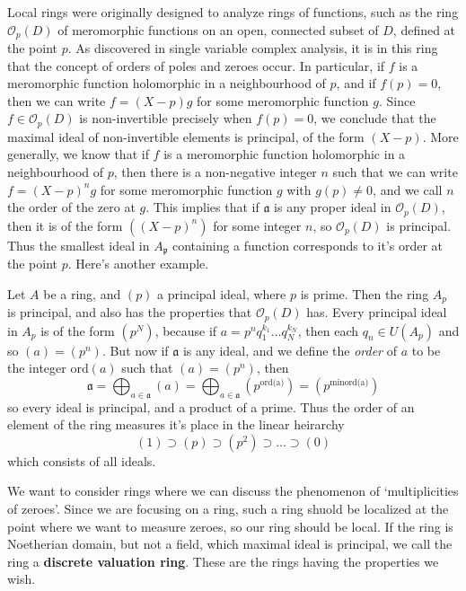 Local rings were originally designed to analyze rings of functions, such as the ring $\mathcal{O}_p(D)$ of meromorphic functions on an open, connected subset of $D$, defined at the point $p$. As discovered in single variable complex analysis, it is in this ring that the concept of orders of poles and zeroes occur. In particular, if $f$ is a meromorphic function holomorphic in a neighbourhood of $p$, and if $f(p) = 0$, then we can write $f = (X-p)g$ for some meromorphic function $g$. Since $f \in \mathcal{O}_p(D)$ is non-invertible precisely when $f(p) = 0$, we conclude that the maximal ideal of non-invertible elements is principal, of the form $(X-p)$. More generally, we know that if $f$ is a meromorphic function holomorphic in a neighbourhood of $p$, then there is a non-negative integer $n$ such that we can write $f = (X-p)^ng$ for some meromorphic function $g$ with $g(p) \neq 0$, and we call $n$ the order of the zero at $g$. This implies that if $\mathfrak{a}$ is any proper ideal in $\mathcal{O}_p(D)$, then it is of the form $((X - p)^n)$ for some integer $n$, so $\mathcal{O}_p(D)$ is principal. Thus the smallest ideal in $A_{\mathfrak{p}}$ containing a function corresponds to it's order at the point $p$. Here's another example.

\begin{example}
    Let $A$ be a ring, and $(p)$ a principal ideal, where $p$ is prime. Then the ring $A_p$ is principal, and also has the properties that $\mathcal{O}_p(D)$ has. Every principal ideal in $A_p$ is of the form $(p^N)$, because if $a = p^n q_1^{k_1} \dots q_N^{k_N}$, then each $q_n \in U(A_p)$ and so $(a) = (p^n)$. But now if $\mathfrak{a}$ is any ideal, and we define the {\it order} of $a$ to be the integer $\text{ord}(a)$ such that $(a) = (p^n)$, then
    \[ \mathfrak{a} = \bigoplus_{a \in \mathfrak{a}} (a) = \bigoplus_{a \in \mathfrak{a}} (p^{\text{ord(a)}}) = (p^{\min \text{ord(a)}}) \]
    so every ideal is principal, and a product of a prime. Thus the order of an element of the ring measures it's place in the linear heirarchy
    \[ (1) \supset (p) \supset (p^2) \supset \dots \supset (0) \]
    which consists of all ideals.
\end{example}

We want to consider rings where we can discuss the phenomenon of `multiplicities of zeroes'. Since we are focusing on a ring, such a ring shuold be localized at the point where we want to measure zeroes, so our ring should be local. If the ring is Noetherian domain, but not a field, which maximal ideal is principal, we call the ring a {\bf discrete valuation ring}. These are the rings having the properties we wish.

